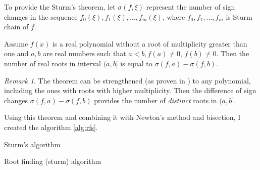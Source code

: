 \documentclass[
  digital, %
  table,   %
  nolof,     %
  nolot,     %
	draft, %
]{fithesis3}
\begin{document}
To provide the Sturm's theorem, let $\sigma(f,\xi)$ represent the number of sign changes in the sequence $f_{0}(\xi), f_{1}(\xi),\ldots,f_{m}(\xi)$, where $f_{0}, f_{1},\ldots,f_{m}$ is Sturm chain of $f$.

\begin{theorem}
Assume $f(x)$ is a real polynomial without a root of multiplicity greater than one and $a, b$ are real numbers such that $a<b, f(a)\neq{0}$, $f(b)\neq{0}$. Then the number of real roots in interval $(a,b]$ is equal to $\sigma(f,a) - \sigma(f,b)$.
\end{theorem}
\theoremstyle{remark}
\newtheorem*{remark}{Remark}
\begin{remark}
  The theorem can be strengthened (as proven in \cite{sturmGeneral}) to any polynomial, including the ones with roots with higher multiplicity. Then the difference of sign changes $\sigma(f,a) - \sigma(f,b)$ provides the number of \textit{distinct} roots in $(a,b]$.
\end{remark}
Using this theorem and combining it with Newton's method and bisection, I created the algorithm \ref{alg:rfs}.
\begin{algorithm}
  \caption{Sturm's algorithm
    \label{alg:sturm}}
  \begin{algorithmic}[1]
    \Statex
			\EndIf
			\EndIf
			\EndIf
			\EndIf
		\EndWhile
		\State{}
    \EndFunction
  \end{algorithmic}
\end{algorithm}
\begin{algorithm}
  \caption{Root finding (sturm) algorithm
    \label{alg:rfs}}
  \begin{algorithmic}[1]
    \Statex
						\State{}
					\EndIf
				\EndIf
			\EndIf
    \EndFunction
  \end{algorithmic}
\end{algorithm}
\end{document}

